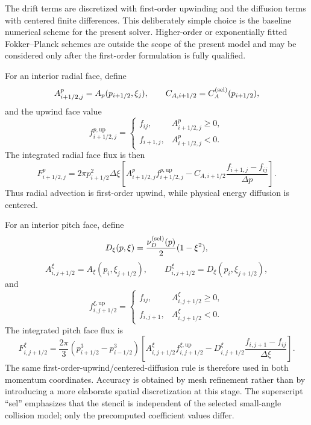 \documentclass[11pt]{article}
\begin{document}
The drift terms are discretized with first-order upwinding and the diffusion terms with
centered finite differences.  This deliberately simple choice is the baseline numerical
scheme for the present solver.  Higher-order or exponentially fitted Fokker--Planck
schemes are outside the scope of the present model and may be considered only after the
first-order formulation is fully qualified.

For an interior radial face, define
\begin{equation}
 A^p_{i+1/2,j}=A_p(p_{i+1/2},\xi_j),\qquad
 C_{A,i+1/2}=C_A^{({\rm sel})}(p_{i+1/2}),
\end{equation}
and the upwind face value
\begin{equation}
 f^{p,\mathrm{up}}_{i+1/2,j}=
 \begin{cases}
   f_{ij}, & A^p_{i+1/2,j}\ge 0,\\
   f_{i+1,j}, & A^p_{i+1/2,j}<0.
 \end{cases}
 \label{eq:radial_upwind_state}
\end{equation}
The integrated radial face flux is then
\begin{equation}
 F^p_{i+1/2,j}
 =2\pi p_{i+1/2}^2\Delta\xi
 \left[
 A^p_{i+1/2,j}f^{p,\mathrm{up}}_{i+1/2,j}
 -C_{A,i+1/2}
 \frac{f_{i+1,j}-f_{ij}}{\Delta p}
 \right].
 \label{eq:radial_fv_flux}
\end{equation}
Thus radial advection is first-order upwind, while physical energy diffusion is centered.

For an interior pitch face, define
\begin{equation}
 D_\xi(p,\xi)=\frac{\nu_D^{({\rm sel})}(p)}{2}(1-\xi^2),
\end{equation}
\begin{equation}
 A^\xi_{i,j+1/2}=A_\xi(p_i,\xi_{j+1/2}),\qquad
 D^\xi_{i,j+1/2}=D_\xi(p_i,\xi_{j+1/2}),
\end{equation}
and
\begin{equation}
 f^{\xi,\mathrm{up}}_{i,j+1/2}=
 \begin{cases}
   f_{ij}, & A^\xi_{i,j+1/2}\ge 0,\\
   f_{i,j+1}, & A^\xi_{i,j+1/2}<0.
 \end{cases}
 \label{eq:pitch_upwind_state}
\end{equation}
The integrated pitch face flux is
\begin{equation}
 F^\xi_{i,j+1/2}
 =\frac{2\pi}{3}
  \left(p_{i+1/2}^3-p_{i-1/2}^3\right)
 \left[
 A^\xi_{i,j+1/2}f^{\xi,\mathrm{up}}_{i,j+1/2}
 -D^\xi_{i,j+1/2}
 \frac{f_{i,j+1}-f_{ij}}{\Delta\xi}
 \right].
 \label{eq:pitch_fv_flux}
\end{equation}
The same first-order-upwind/centered-diffusion rule is therefore used in both momentum
coordinates.  Accuracy is obtained by mesh refinement rather than by introducing a more
elaborate spatial discretization at this stage.
The superscript ``sel'' emphasizes that the stencil is independent of the selected
small-angle collision model; only the precomputed coefficient values differ.
\end{document}
